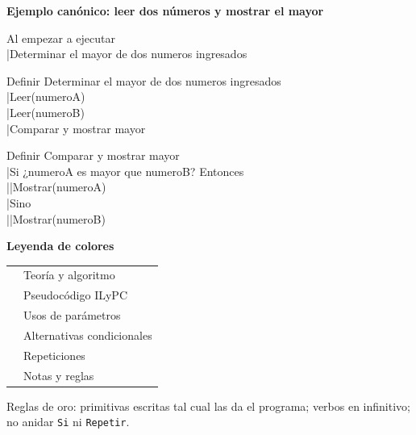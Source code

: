 \documentclass[a4paper,11pt,landscape]{article}
\begin{document}
\begin{center}
  \begin{minipage}{0.58\textwidth}
    \begin{center}
      {\small\bfseries\sffamily Ejemplo canónico: leer dos números y mostrar el mayor}
    \end{center}
    {\ttfamily\small
      Al empezar a ejecutar\\
      |Determinar el mayor de dos numeros ingresados
      \par\vspace{2pt}
      Definir Determinar el mayor de dos numeros ingresados\\
      |Leer(numeroA)\\
      |Leer(numeroB)\\
      |Comparar y mostrar mayor
      \par\vspace{2pt}
      Definir Comparar y mostrar mayor\\
      |Si ¿numeroA es mayor que numeroB? Entonces\\
      ||Mostrar(numeroA)\\
      |Sino\\
      ||Mostrar(numeroB)
    }
  \end{minipage}
  \hspace{4mm}
  \begin{minipage}{0.34\textwidth}
    \begin{center}
      {\small\bfseries\sffamily Leyenda de colores}
    \end{center}
    {\small\sffamily
    \begin{tabular}{@{}ll@{}}
      \color{azulT}{\rule{5mm}{2mm}} & Teoría y algoritmo\\
      \color{verdeT}{\rule{5mm}{2mm}} & Pseudocódigo ILyPC\\
      \color{naranjaT}{\rule{5mm}{2mm}} & Usos de parámetros\\
      \color{rojoT}{\rule{5mm}{2mm}} & Alternativas condicionales\\
      \color{violetaT}{\rule{5mm}{2mm}} & Repeticiones\\
      \color{grisT}{\rule{5mm}{2mm}} & Notas y reglas\\
    \end{tabular}
    }
    \vspace{2mm}

    {\footnotesize\sffamily\color{grisT}
      Reglas de oro: primitivas escritas tal cual las da el programa; verbos en infinitivo; no anidar \texttt{Si} ni \texttt{Repetir}.
    }
  \end{minipage}
\end{center}
\end{document}
